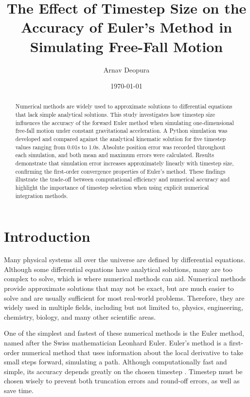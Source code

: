 \documentclass[12pt]{article}
\title{The Effect of Timestep Size on the Accuracy of Euler's Method in Simulating Free-Fall Motion}
\author{Arnav Deopura}
\date{\today}
\begin{document}
\maketitle

\begin{abstract}
Numerical methods are widely used to approximate solutions to differential equations that lack simple analytical solutions. This study investigates how timestep size influences the accuracy of the forward Euler method when simulating one-dimensional free-fall motion under constant gravitational acceleration. A Python simulation was developed and compared against the analytical kinematic solution for five timestep values ranging from 0.01s to 1.0s. Absolute position error was recorded throughout each simulation, and both mean and maximum errors were calculated. Results demonstrate that simulation error increases approximately linearly with timestep size, confirming the first-order convergence properties of Euler's method. These findings illustrate the trade-off between computational efficiency and numerical accuracy and highlight the importance of timestep selection when using explicit numerical integration methods.
\end{abstract}

\section{Introduction}

Many physical systems all over the universe are defined by differential equations. Although some differential equations have analytical solutions, many are too complex to solve, which is where numerical methods can aid. Numerical methods provide approximate solutions that may not be exact, but are much easier to solve and are usually sufficient for most real-world problems. Therefore, they are widely used in multiple fields, including but not limited to, physics, engineering, chemistry, biology, and many other scientific areas.

One of the simplest and fastest of these numerical methods is the Euler method, named after the Swiss mathematician Leonhard Euler. Euler's method is a first-order numerical method that uses information about the local derivative to take small steps forward, simulating a path. Although computationally fast and simple, its accuracy depends greatly on the chosen timestep \citep{gilat2013}. Timestep must be chosen wisely to prevent both truncation errors and round-off errors, as well as save time.
\end{document}
